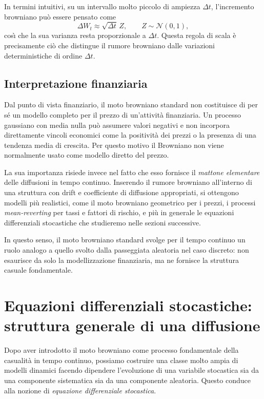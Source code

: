 In termini intuitivi, su un intervallo molto piccolo di ampiezza
$\Delta t$, l'incremento browniano pu\`{o} essere pensato come
\[
\Delta W_t \approx \sqrt{\Delta t}\,Z,
\qquad
Z\sim \mathcal{N}(0,1),
\]
cos\`{\i} che la sua varianza resta proporzionale a $\Delta t$. Questa
regola di scala \`{e} precisamente ci\`{o} che distingue il rumore
browniano dalle variazioni deterministiche di ordine $\Delta t$.

\subsection*{Interpretazione finanziaria}

Dal punto di vista finanziario, il moto browniano standard non
costituisce di per s\'{e} un modello completo per il prezzo di un'attivit\`{a}
finanziaria. Un processo gaussiano con media nulla pu\`{o} assumere
valori negativi e non incorpora direttamente vincoli economici come la
positivit\`{a} dei prezzi o la presenza di una tendenza media di crescita.
Per questo motivo il Browniano non viene normalmente usato come modello
diretto del prezzo.

La sua importanza risiede invece nel fatto che esso fornisce il
\emph{mattone elementare} delle diffusioni in tempo continuo. Inserendo
il rumore browniano all'interno di una struttura con drift e coefficiente
di diffusione appropriati, si ottengono modelli pi\`{u} realistici, come
il moto browniano geometrico per i prezzi, i processi
\emph{mean-reverting} per tassi e fattori di rischio, e pi\`{u} in
generale le equazioni differenziali stocastiche che studieremo nelle
sezioni successive.

In questo senso, il moto browniano standard svolge per il tempo continuo
un ruolo analogo a quello svolto dalla passeggiata aleatoria nel caso
discreto: non esaurisce da solo la modellizzazione finanziaria, ma ne
fornisce la struttura casuale fondamentale.


\section{Equazioni differenziali stocastiche: struttura generale di una diffusione}
\label{sec:continuo}

Dopo aver introdotto il moto browniano come processo fondamentale della
casualit\`a in tempo continuo, possiamo costruire una classe molto ampia
di modelli dinamici facendo dipendere l'evoluzione di una variabile
stocastica sia da una componente sistematica sia da una componente
aleatoria. Questo conduce alla nozione di \emph{equazione differenziale
stocastica}.

